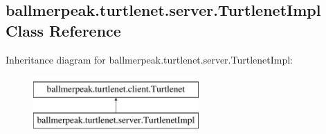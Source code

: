 \hypertarget{classballmerpeak_1_1turtlenet_1_1server_1_1TurtlenetImpl}{\subsection{ballmerpeak.\-turtlenet.\-server.\-Turtlenet\-Impl Class Reference}
\label{classballmerpeak_1_1turtlenet_1_1server_1_1TurtlenetImpl}
}
Inheritance diagram for ballmerpeak.\-turtlenet.\-server.\-Turtlenet\-Impl\-:\begin{figure}[H]
\begin{center}
\leavevmode
\includegraphics[height=2.000000cm]{classballmerpeak_1_1turtlenet_1_1server_1_1TurtlenetImpl}
\end{center}
\end{figure}
